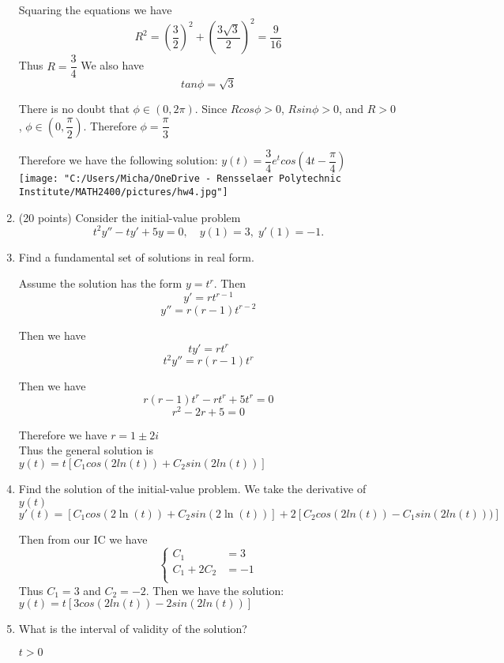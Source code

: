 \begin{enumerate}
Squaring the equations we have $$R^2 = (\dfrac{3}{2})^2 + (\dfrac{3 \sqrt{3}}{2})^2 = \dfrac{9}{16}$$
Thus $R = \dfrac{3}{4}$
We also have $$tan \phi = \sqrt{3}$$

There is no doubt that $\phi \in (0, 2 \pi)$. Since $R cos \phi > 0$, $R sin \phi >0$, and $R > 0$, $\phi \in (0, \dfrac{\pi}{2})$. Therefore $\phi = \dfrac{\pi}{3}$

Therefore we have the following solution: $y(t) = \dfrac{3}{4}e^tcos(4t - \dfrac{\pi}{4})$\\
	\texttt{[image: "C:/Users/Micha/OneDrive - Rensselaer Polytechnic Institute/MATH2400/pictures/hw4.jpg"]}
\item (20 points)  Consider the initial-value problem
\begin{equation*}
t^2y''-ty'+5y=0, \quad y(1)=3, \; y'(1) = -1.
\end{equation*}
\benum
\item Find a fundamental set of solutions in real form.

Assume the solution has the form $y = t^r$. Then
$$y' = rt^{r-1}$$ $$y''= r(r-1)t^{r-2}$$

Then we have 
$$ty' = rt^{r}$$
$$t^2y'' = r(r-1)t^r$$

Then we have 
$$r(r-1)t^r - rt^{r} + 5t^{r} = 0$$
$$r^2-2r+5 = 0$$

Therefore we have $r = 1 \pm 2i$\\
Thus the general solution is $y(t) = t[C_1cos(2ln(t))+C_2sin(2ln(t))]$
\item Find the solution of the initial-value problem.
We take the derivative of $y(t)$
$$y'(t) = [C_1cos(2 \ln (t))+C_2sin(2 \ln (t))] + 2[C_2cos(2ln(t))-C_1sin(2ln(t)))]$$

Then from our IC we have
\begin{equation*}
	\begin{cases}
		C_1 &= 3\\
		C_1 + 2C_2 &= -1\\
	\end{cases}
\end{equation*}
Thus $C_1 = 3$ and $C_2 = -2$.
Then we have the solution: $y(t) = t[3cos(2ln(t))-2sin(2ln(t))]$
\item What is the interval of validity of the solution?

$t > 0$
\eenum



\end{enumerate}

